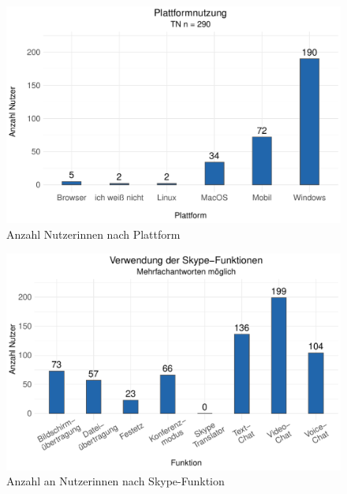 

\begin{figure}[p]
    \includegraphics[width=.85\textwidth]{Figures/Umfrage/GGplot/ggplot_skype-plattform_nutzer}
	\caption{Anzahl Nutzer{\textperiodcentered}innen nach Plattform\label{K6:fig:Nutzung-Plattform}}
\end{figure}


\begin{figure}[p]
	\includegraphics[width=.85\textwidth]{Figures/Umfrage/GGplot/ggplot_skype-funktion_nutzer}
	\caption{Anzahl an Nutzer{\textperiodcentered}innen nach Skype-Funktion}
	\label{K6:fig:Nutzung-Funktionen}
\end{figure}



